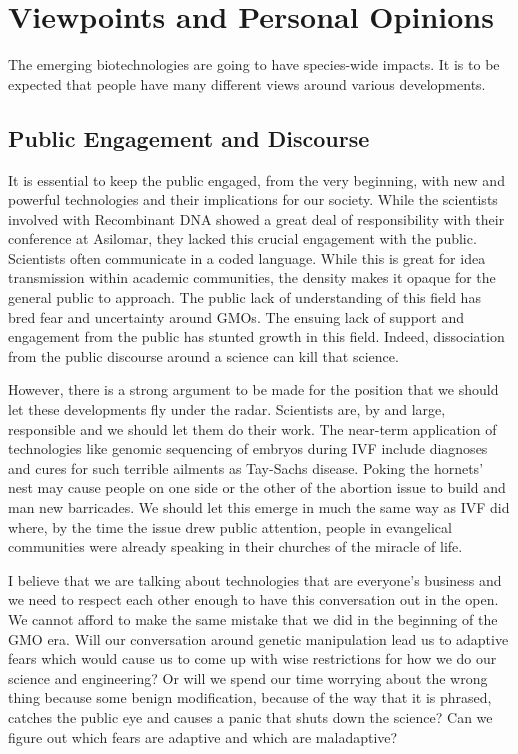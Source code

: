 \section{Viewpoints and Personal Opinions}
\label{sec:viewpoints}

The emerging biotechnologies are going to have species-wide impacts.
It is to be expected that people have many different views around various developments.

\subsection{Public Engagement and Discourse}

It is essential to keep the public engaged, from the very beginning, with new and powerful technologies and their implications for our society.
While the scientists involved with Recombinant DNA showed a great deal of responsibility with their conference at Asilomar, they lacked this crucial engagement with the public.
Scientists often communicate in a coded language.
While this is great for idea transmission within academic communities, the density makes it opaque for the general public to approach.
The public lack of understanding of this field has bred fear and uncertainty around GMOs.
The ensuing lack of support and engagement from the public has stunted growth in this field.
Indeed, dissociation from the public discourse around a science can kill that science.

However, there is a strong argument to be made for the position that we should let these developments fly under the radar.
Scientists are, by and large, responsible and we should let them do their work.
The near-term application of technologies like genomic sequencing of embryos during IVF include diagnoses and cures for such terrible ailments as Tay-Sachs disease.
Poking the hornets' nest may cause people on one side or the other of the abortion issue to build and man new barricades.
We should let this emerge in much the same way as IVF did where, by the time the issue drew public attention, people in evangelical communities were already speaking in their churches of the miracle of life.

I believe that we are talking about technologies that are everyone's business and we need to respect each other enough to have this conversation out in the open.
We cannot afford to make the same mistake that we did in the beginning of the GMO era.
Will our conversation around genetic manipulation lead us to adaptive fears which would cause us to come up with wise restrictions for how we do our science and engineering?
Or will we spend our time worrying about the wrong thing because some benign modification, because of the way that it is phrased, catches the public eye and causes a panic that shuts down the science?
Can we figure out which fears are adaptive and which are maladaptive?


